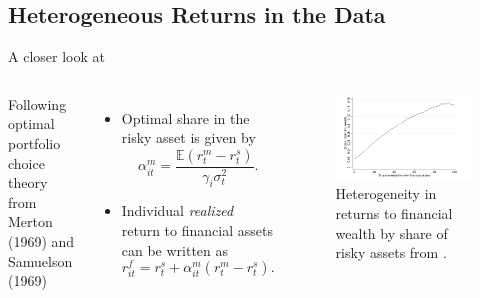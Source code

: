 \documentclass{beamer}
\begin{document}
\subsection{Heterogeneous Returns in the Data}
\begin{frame}{A closer look at \cite{aflgdmlp20}}
   
   \begin{columns}
     \small
     Following optimal portfolio choice theory from Merton (1969) and Samuelson (1969)
    \centering
    
    \begin{itemize}
    \item Optimal share in the risky asset is given by
    $$ \alpha_{it}^{m} = \frac{\mathbb{E}(r_{t}^{m} - r_{t}^{s})}{\gamma_i \sigma^{2}_{t}}.$$
    \item Individual \textit{realized} return to financial assets can be written as 
    $$ r_{it}^{f} = r_{t}^{s} + \alpha_{it}^{m} (r_{t}^{m} - r_{t}^{s}). $$
    \end{itemize}
    
    \centering
    \begin{figure}
    \includegraphics[width=\textwidth]{Figures/Fagereng2020Fig1.png}
    \captionsetup{font=scriptsize}
    \caption{Heterogeneity in returns to financial wealth by share of risky assets from \cite{aflgdmlp20}.}
    \end{figure}
  \end{columns}
   
\end{frame}
\end{document}
